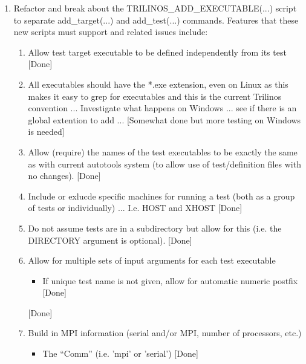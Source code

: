 \documentclass[pdf,ps2pdf,11pt]{SANDreport}
\begin{document}
\begin{enumerate}
{}\item Refactor and break about the TRILINOS\_ADD\_EXECUTABLE(...) 
script to separate add\_target(...) and add\_test(...) commands.
Features that these new scripts must support and related issues
include:

  \begin{enumerate}

  {}\item Allow test target executable to be defined independently
  from its test [Done]

  {}\item All executables should have the *.exe extension, even on
  Linux as this makes it easy to grep for executables and this is the
  current Trilinos convention ... Investigate what happens on Windows
  ... see if there is an global extention to add ... [Somewhat done
  but more testing on Windows is needed]

  {}\item Allow (require) the names of the test executables to be
  exactly the same as with current autotools system (to allow use of
  test/definition files with no changes). [Done]

  {}\item Include or exlucde specific machines for running a test
  (both as a group of tests or individually) ... I.e. HOST and XHOST
  [Done]

  {}\item Do not assume tests are in a subdirectory but allow for this
  (i.e. the DIRECTORY argument is optional). [Done]

  {}\item Allow for multiple sets of input arguments for each test
  executable

    \begin{itemize}

    {}\item If unique test name is not given, allow for automatic
    numeric postfix [Done]

    \end{itemize}

   [Done]

  {}\item Build in MPI information (serial and/or MPI, number of
  processors, etc.)

    \begin{itemize}

    {}\item The ``Comm'' (i.e. 'mpi' or 'serial') [Done]


\end{itemize}
\end{enumerate}
\end{enumerate}
\end{document}
